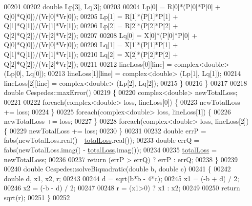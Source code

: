 \begin{DoxyCode}
00201 
00202     \textcolor{keywordtype}{double} Lp[3], Lq[3];
00203 
00204     Lp[0] = R[0]*(P[0]*P[0] + Q[0]*Q[0])/(Vr[0]*Vr[0]);
00205     Lp[1] = R[1]*(P[1]*P[1] + Q[1]*Q[1])/(Vr[1]*Vr[1]);
00206     Lp[2] = R[2]*(P[2]*P[2] + Q[2]*Q[2])/(Vr[2]*Vr[2]);
00207 
00208     Lq[0] = X[0]*(P[0]*P[0] + Q[0]*Q[0])/(Vr[0]*Vr[0]);
00209     Lq[1] = X[1]*(P[1]*P[1] + Q[1]*Q[1])/(Vr[1]*Vr[1]);
00210     Lq[2] = X[2]*(P[2]*P[2] + Q[2]*Q[2])/(Vr[2]*Vr[2]);
00211 
00212     lineLoss[0][line] = complex<double> (Lp[0], Lq[0]);
00213     lineLoss[1][line] = complex<double> (Lp[1], Lq[1]);
00214     lineLoss[2][line] = complex<double> (Lp[2], Lq[2]);
00215   \}
00216 \}
00217 
00218 \textcolor{keywordtype}{double} Cespedes::maxError()
00219 \{
00220   complex<double> newTotalLoss;
00221 
00222   \textcolor{keywordflow}{foreach}(complex<double> loss, lineLoss[0]) \{
00223     newTotalLoss += loss;
00224   \}
00225   \textcolor{keywordflow}{foreach}(complex<double> loss, lineLoss[1]) \{
00226     newTotalLoss += loss;
00227   \}
00228   \textcolor{keywordflow}{foreach}(complex<double> loss, lineLoss[2]) \{
00229     newTotalLoss += loss;
00230   \}
00231 
00232   \textcolor{keywordtype}{double} errP =  fabs(newTotalLoss.real() - \hyperlink{class_cespedes_ae1a95c3c22fff9c230fd528d9b191966}{totalLoss}.real());
00233   \textcolor{keywordtype}{double} errQ =  fabs(newTotalLoss.imag() - \hyperlink{class_cespedes_ae1a95c3c22fff9c230fd528d9b191966}{totalLoss}.imag());
00234 
00235   \hyperlink{class_cespedes_ae1a95c3c22fff9c230fd528d9b191966}{totalLoss} = newTotalLoss;
00236 
00237   \textcolor{keywordflow}{return} (errP > errQ) ? errP : errQ;
00238 \}
00239 
00240 \textcolor{keywordtype}{double} Cespedes::solveBiquadratic(\textcolor{keywordtype}{double} b, \textcolor{keywordtype}{double} c)
00241 \{
00242   \textcolor{keywordtype}{double} d, x1, x2, r;
00243 
00244   d = sqrt(b*b - 4*c);
00245   x1 = (-b + d) / 2;
00246   x2 = (-b - d) / 2;
00247 
00248   r = (x1>0) ? x1 : x2;
00249 
00250   \textcolor{keywordflow}{return} sqrt(r);
00251 \}
00252 
\end{DoxyCode}
